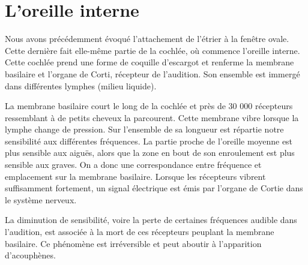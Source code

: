 \documentclass[
  letterpaper,
  DIV=11,
  numbers=noendperiod]{scrreprt}
\begin{document}
\hypertarget{loreille-interne}{%
\section{L'oreille interne}\label{loreille-interne}}

Nous avons précédemment évoqué l'attachement de l'étrier à la fenêtre
ovale. Cette dernière fait elle-même partie de la cochlée, où commence
l'oreille interne. Cette cochlée prend une forme de coquille d'escargot
et renferme la membrane basilaire et l'organe de Corti, récepteur de
l'audition. Son ensemble est immergé dans différentes lymphes (milieu
liquide).

La membrane basilaire court le long de la cochlée et près de 30 000
récepteurs ressemblant à de petits cheveux la parcourent. Cette membrane
vibre lorsque la lymphe change de pression. Sur l'ensemble de sa
longueur est répartie notre sensibilité aux différentes fréquences. La
partie proche de l'oreille moyenne est plus sensible aux aiguës, alors
que la zone en bout de son enroulement est plus sensible aux graves. On
a donc une correspondance entre fréquence et emplacement sur la membrane
basilaire. Lorsque les récepteurs vibrent suffisamment fortement, un
signal électrique est émis par l'organe de Cortie dans le système
nerveux.

La diminution de sensibilité, voire la perte de certaines fréquences
audible dans l'audition, est associée à la mort de ces récepteurs
peuplant la membrane basilaire. Ce phénomène est irréversible et peut
aboutir à l'apparition d'acouphènes.
\end{document}
